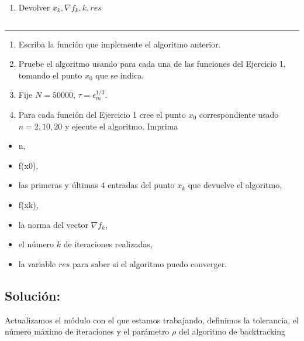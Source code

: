 \documentclass[11pt]{article}
\providecommand{\tightlist}{%
      \setlength{\itemsep}{0pt}\setlength{\parskip}{0pt}}
\begin{document}
\begin{enumerate}
\def\labelenumi{\arabic{enumi}.}
\setcounter{enumi}{2}
\tightlist
\item
  Devolver \(x_k, \nabla f_k, k, res\)
\end{enumerate}

\begin{verbatim}
\end{verbatim}

\begin{center}\rule{0.5\linewidth}{0.5pt}\end{center}

\begin{enumerate}
\def\labelenumi{\arabic{enumi}.}
\tightlist
\item
  Escriba la función que implemente el algoritmo anterior.
\item
  Pruebe el algoritmo usando para cada una de las funciones del
  Ejercicio 1, tomando el punto \(x_0\) que se indica.
\item
  Fije \(N=50000\), \(\tau = \epsilon_m^{1/3}\).
\item
  Para cada función del Ejercicio 1 cree el punto \(x_0\)
  correspondiente usado \(n=2, 10, 20\) y ejecute el algoritmo. Imprima
\end{enumerate}

\begin{itemize}
\tightlist
\item
  n,
\item
  f(x0),
\item
  las primeras y últimas 4 entradas del punto \(x_k\) que devuelve el
  algoritmo,
\item
  f(xk),
\item
  la norma del vector \(\nabla f_k\),
\item
  el número \(k\) de iteraciones realizadas,
\item
  la variable \(res\) para saber si el algoritmo puedo converger.
\end{itemize}

\hypertarget{soluciuxf3n}{%
\subsection{Solución:}\label{soluciuxf3n}}

    Actualizamos el módulo con el que estamos trabajando, definimos la
tolerancia, el número máximo de iteraciones y el parámetro \(\rho\) del
algoritmo de backtracking
\end{document}
